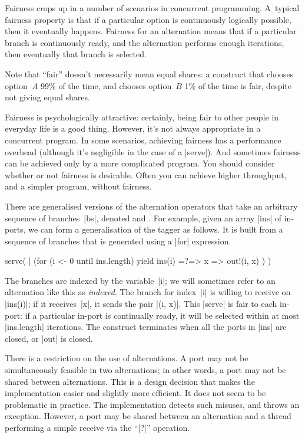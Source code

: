 
Fairness crops up in a number of scenarios in concurrent
programming.
%
A~typical fairness property is that if a particular option is continuously
logically possible, then it eventually happens.  Fairness for an alternation
means that if a particular branch is continuously ready, and the alternation
performs enough iterations, then eventually that branch is selected.

Note that ``fair'' doesn't necessarily mean equal shares: a construct that
chooses option~$A$ 99\% of the time, and chooses option~$B$ 1\% of the time is
fair, despite not giving equal shares.

Fairness is psychologically attractive: certainly, being fair to other people
in everyday life is a good thing.  However, it's not always appropriate in a
concurrent program.  In some scenarios, achieving fairness has a performance
overhead (although it's negligible in the case of a |serve|).  And sometimes
fairness can be achieved only by a more complicated program.  You should
consider whether or not fairness is desirable.  Often you can achieve higher
throughput, and a simpler program, without fairness.


There are generalised versions of the alternation operators that take an
arbitrary sequence of branches~|bs|, denoted 
and .  For example, given an array |ins| of in-ports,
we can form a generalisation of the tagger as follows.  It is built from a
sequence of branches that is generated using a |for| expression.
% 
\begin{scala}
  serve( | (for (i <- 0 until ins.length) yield ins(i) =?=> { x => out!(i, x) }) )
\end{scala}
%
The branches are indexed by the variable~|i|; we will sometimes refer to an
alternation like this as \emph{indexed}.  The branch for
index~|i| is willing to receive on |ins(i)|; if it receives~|x|, it sends the
pair |(i, x)|.  This |serve| is fair to each in-port: if a particular in-port
is continually ready, it will be selected within at most |ins.length|
iterations.  The construct terminates when all the ports in |ins| are closed,
or |out| is closed.

There is a restriction on the use of alternations.  A port may not be
simultaneously feasible in two alternations; in other words, a port may not be
shared between alternations.  This is a design decision that makes the
implementation easier and slightly more efficient.  It does not seem to be
problematic in practice.  The implementation detects such misuses, and throws
an exception.  However, a port may be shared between an alternation and a
thread performing a simple receive via the ``|?|'' operation.
